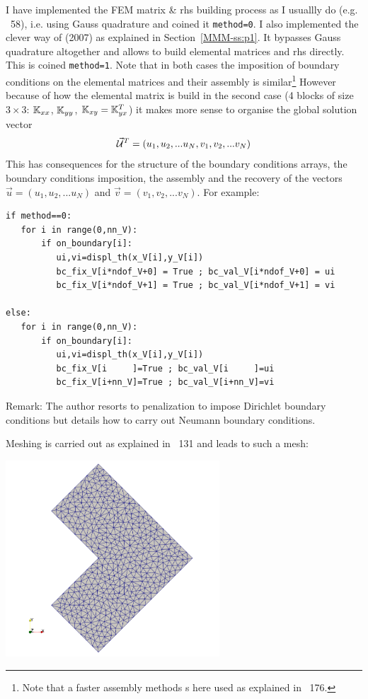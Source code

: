 I have implemented the FEM matrix \& rhs building process as I 
usuallly do (e.g. \stone~58), i.e. using Gauss quadrature and
coined it \lstinline{method=0}.
I also implemented the clever way of \textcite{koko07} (2007)
as explained in Section~\ref{MMM-ss:p1}. It bypasses Gauss quadrature
altogether and allows to build elemental matrices and rhs directly.
This is coined \lstinline{method=1}.
Note that in both cases the imposition of boundary conditions on the 
elemental matrices and their assembly is similar\footnote{Note 
that a faster assembly methods s here used as explained in \stone~176.} 
However because of how the elemental matrix is build in the second case
(4 blocks of size $3\times 3$: ${\mathbb{K}}_{xx}$, ${\mathbb{K}}_{yy}$, ${\mathbb{K}}_{xy}={\mathbb{K}}_{yx}^T$)
it makes more sense to organise the global solution vector 
\[
\vec{\cal U}^T=(u_1,u_2, ...u_N,v_1,v_2,... v_N)
\]
This has consequences for the structure of the boundary conditions arrays, 
the boundary conditions imposition, the assembly and the recovery of 
the vectors $\vec{u}=(u_1,u_2,...u_N)$ and $\vec{v}=(v_1,v_2,...v_N)$. 
For example:
\begin{lstlisting}
if method==0:
   for i in range(0,nn_V):
       if on_boundary[i]: 
          ui,vi=displ_th(x_V[i],y_V[i])
          bc_fix_V[i*ndof_V+0] = True ; bc_val_V[i*ndof_V+0] = ui
          bc_fix_V[i*ndof_V+1] = True ; bc_val_V[i*ndof_V+1] = vi

else:
   for i in range(0,nn_V):
       if on_boundary[i]: 
          ui,vi=displ_th(x_V[i],y_V[i])
          bc_fix_V[i     ]=True ; bc_val_V[i     ]=ui
          bc_fix_V[i+nn_V]=True ; bc_val_V[i+nn_V]=vi
\end{lstlisting}

Remark: The author resorts to penalization to impose Dirichlet 
boundary conditions but details how to carry out Neumann boundary conditions.

Meshing is carried out as explained in \stone~131 and leads to such a mesh:
\begin{center}
\includegraphics[width=8cm]{python_codes/fieldstone_179/RESULTS/mesh}
\end{center}

